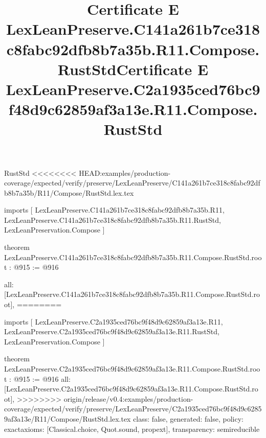 \begin{lexlean}{RustStd}
<<<<<<<< HEAD:examples/production-coverage/expected/verify/preserve/LexLeanPreserve/C141a261b7ce318c8fabc92dfb8b7a35b/R11/Compose/RustStd.lex.tex
\title{Certificate E LexLeanPreserve.C141a261b7ce318c8fabc92dfb8b7a35b.R11.Compose.RustStd}
\begin{coremodule}
imports [
  LexLeanPreserve.C141a261b7ce318c8fabc92dfb8b7a35b.R11,
  LexLeanPreserve.C141a261b7ce318c8fabc92dfb8b7a35b.R11.RustStd,
  LexLeanPreservation.Compose
]

theorem LexLeanPreserve.C141a261b7ce318c8fabc92dfb8b7a35b.R11.Compose.RustStd.root : @915 := @916 {
  all: [LexLeanPreserve.C141a261b7ce318c8fabc92dfb8b7a35b.R11.Compose.RustStd.root],
========
\title{Certificate E LexLeanPreserve.C2a1935ced76bc9f48d9c62859af3a13e.R11.Compose.RustStd}
\begin{coremodule}
imports [
  LexLeanPreserve.C2a1935ced76bc9f48d9c62859af3a13e.R11,
  LexLeanPreserve.C2a1935ced76bc9f48d9c62859af3a13e.R11.RustStd,
  LexLeanPreservation.Compose
]

theorem LexLeanPreserve.C2a1935ced76bc9f48d9c62859af3a13e.R11.Compose.RustStd.root : @915 := @916 {
  all: [LexLeanPreserve.C2a1935ced76bc9f48d9c62859af3a13e.R11.Compose.RustStd.root],
>>>>>>>> origin/release/v0.4:examples/production-coverage/expected/verify/preserve/LexLeanPreserve/C2a1935ced76bc9f48d9c62859af3a13e/R11/Compose/RustStd.lex.tex
  class: false,
  generated: false,
  policy: exact{axioms: [Classical.choice, Quot.sound, propext]},
  transparency: semireducible
}


\end{coremodule}}
\end{coremodule}
\end{lexlean}
